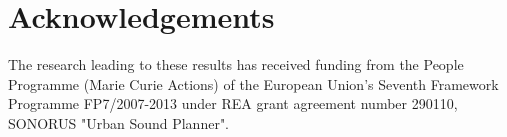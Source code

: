 \newpage\section*{Acknowledgements}




The research leading to these results has received funding from
the People Programme (Marie Curie Actions) of the European Union's Seventh
Framework Programme FP7/2007-2013 under REA grant agreement number 290110,
SONORUS "Urban Sound Planner".
